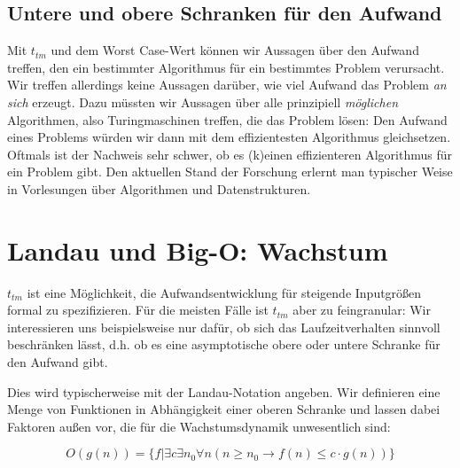
\subsection{Untere und obere Schranken für den Aufwand}
Mit $t_{tm}$ und dem Worst Case-Wert können wir Aussagen über den Aufwand treffen,
den ein bestimmter Algorithmus für ein bestimmtes Problem verursacht.
Wir treffen allerdings keine Aussagen darüber,
wie viel Aufwand das Problem \emph{an sich} erzeugt.
Dazu müssten wir Aussagen über alle prinzipiell \emph{möglichen} Algorithmen,
also Turingmaschinen treffen,
die das Problem lösen:
Den Aufwand eines Problems würden wir dann mit dem effizientesten Algorithmus gleichsetzen.
Oftmals ist der Nachweis sehr schwer,
ob es (k)einen effizienteren Algorithmus
für ein Problem gibt.
Den aktuellen Stand der Forschung erlernt man typischer Weise in Vorlesungen über
Algorithmen und Datenstrukturen.


\section{Landau und Big-O: Wachstum}

$t_{tm}$ ist eine Möglichkeit,
die Aufwandsentwicklung für steigende Inputgrößen formal zu spezifizieren.
Für die meisten Fälle ist $t_{tm}$ aber zu feingranular:
Wir interessieren uns beispielsweise nur dafür,
ob sich das Laufzeitverhalten sinnvoll beschränken lässt,
d.h. ob es eine asymptotische obere oder untere Schranke für den Aufwand gibt.

Dies wird typischerweise mit der Landau-Notation angeben.
Wir definieren eine Menge von Funktionen in Abhängigkeit einer oberen Schranke
und lassen dabei Faktoren außen vor,
die für die Wachstumsdynamik unwesentlich sind:

\[
O(g(n)) = \{f|\exists c \exists n_0 \forall n (n \geq n_0 \rightarrow f(n) \leq c \cdot g(n))\}
\]

